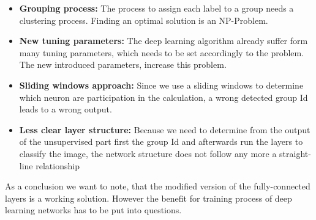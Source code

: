 \begin{itemize}\itemsep0.5pt
    \item \textbf{Grouping process:} The process to assign each label to a group needs a clustering process. Finding an optimal solution is an NP-Problem.
        \item \textbf{New tuning parameters:} The deep learning algorithm already suffer form many tuning parameters, which needs to be set accordingly to the problem. The new introduced parameters, increase this problem.  
	\item \textbf{Sliding windows approach: } Since we use a sliding windows to determine which neuron are participation in the calculation, a wrong detected group Id leads to a wrong output.
	\item \textbf{Less clear layer structure: } Because we need to determine from the output of the unsupervised part first the group Id and afterwards run the layers to classify the image, the network structure does not follow any more a straight-line relationship
\end{itemize}
As a conclusion we want to note, that the modified version of the fully-connected layers is a working solution. However the benefit for training process of deep learning networks has to be put into questions. 
